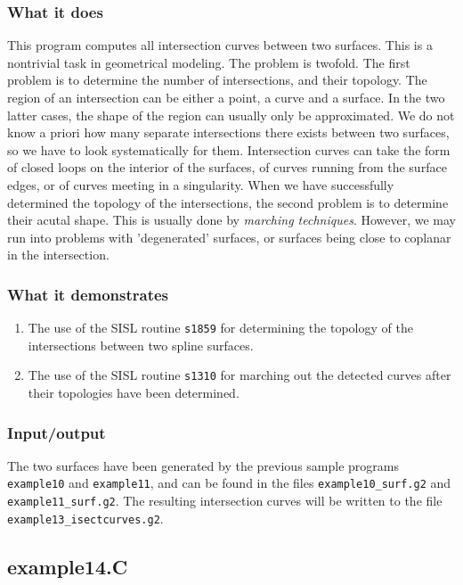 \subsubsection{What it does}
This program computes all intersection curves between two surfaces.  This is a nontrivial
task in geometrical modeling.  The problem is twofold.  The first problem is to determine
the number of intersections, and their topology. The region of an intersection can be either
a point, a curve and a surface.  In the two latter cases, the shape of the region can usually
only be approximated.  We do not know a priori how many separate intersections there exists
between two surfaces, so we have to look systematically for them.  Intersection curves can
take the form of closed loops on the interior of the surfaces, of curves running
from the surface edges, or of curves meeting in a singularity.
When we have successfully determined the topology of the intersections,
the second problem is to determine their acutal shape.  This is usually done by \emph{marching
techniques}.  However, we may run into problems with 'degenerated' surfaces, or surfaces being 
close to coplanar in the intersection.
\subsubsection{What it demonstrates}
\begin{enumerate}
\item The use of the SISL routine \verb/s1859/ for determining the topology of the intersections
between two spline surfaces.
\item The use of the SISL routine \verb/s1310/ for marching out the detected curves after their
topologies have been determined.
\end{enumerate}
\subsubsection{Input/output}
The two surfaces have been generated by the previous sample programs \verb/example10/ and 
\verb/example11/, and can be found in the files \verb/example10_surf.g2/ and \\
\verb/example11_surf.g2/.  The resulting intersection curves will be written to the file
\verb/example13_isectcurves.g2/.

\subsection{example14.C}

